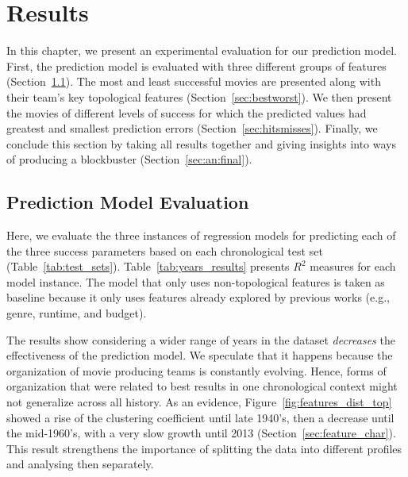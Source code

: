 \section{Results}
\label{sec:results}
In this chapter, we present an experimental evaluation for our prediction
model. First, the prediction model is evaluated with three different groups of
features (Section~\ref{sec:chronological}). The most and least successful
movies are presented along with their team's key topological features
(Section~\ref{sec:bestworst}). We then present the movies of different levels
of success for which the predicted values had greatest and smallest prediction
errors (Section~\ref{sec:hitsmisses}). Finally, we conclude this section by
taking all results together and giving insights into ways of producing a
blockbuster (Section~\ref{sec:an:final}).

\subsection{Prediction Model Evaluation}
\label{sec:chronological}
Here, we evaluate the three instances of regression models for predicting each
of the three success parameters based on each chronological test set
(Table~\ref{tab:test_sets}). Table~\ref{tab:years_results} presents $R^2$
measures for each model instance. The model that only uses non-topological
features is taken as baseline because it only uses features already explored by
previous works (e.g., genre, runtime, and budget).



The results show considering a wider range of years in the dataset
\textit{decreases} the effectiveness of the prediction model. We speculate that
it happens because the organization of movie producing teams is constantly
evolving. Hence, forms of organization that were related to best results in one
chronological context might not generalize across all history. As an evidence,
Figure~\ref{fig:features_dist_top} showed a rise of the clustering coefficient
until late 1940's, then a decrease until the mid-1960's, with a very slow
growth until 2013 (Section~\ref{sec:feature_char}). This result strengthens the
importance of splitting the data into different profiles and analysing then
separately.

